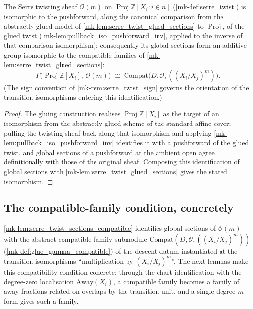 \begin{lemma}
  \label{mk-lem:serre_twist_sections_compatible}
  \leanok
  The Serre twisting sheaf \(\mathcal O(m)\) on
  \(\operatorname{Proj} \mathbb Z[X_i : i \in n]\) (\ref{mk-def:serre_twist})
  is isomorphic to the pushforward, along the canonical comparison from the
  abstractly glued model of \ref{mk-lem:serre_twist_glued_sections} to
  \(\operatorname{Proj}\), of the glued twist
  (\ref{mk-lem:pullback_iso_pushforward_inv}, applied to the inverse of that
  comparison isomorphism); consequently its global sections form an
  additive group isomorphic to the compatible families of
  \ref{mk-lem:serre_twist_glued_sections}:
  \[
    \Gamma\bigl(\operatorname{Proj}\mathbb Z[X_i],\, \mathcal O(m)\bigr)
      \;\cong\; \mathrm{Compat}\bigl(D, \mathcal O, ((X_i/X_j)^m)\bigr).
  \]
  (The sign convention of \ref{mk-rem:serre_twist_sign} governs the
  orientation of the transition isomorphisms entering this identification.)
\end{lemma}
\begin{proof}
  \leanok{}
  The gluing construction realises \(\operatorname{Proj}\mathbb Z[X_i]\) as
  the target of an isomorphism from the abstractly glued scheme of the
  standard affine cover; pulling the twisting sheaf back along that
  isomorphism and applying \ref{mk-lem:pullback_iso_pushforward_inv}
  identifies it with a pushforward of the glued twist, and global sections
  of a pushforward at the ambient open agree definitionally with those of
  the original sheaf. Composing this identification of global sections with
  \ref{mk-lem:serre_twist_glued_sections} gives the stated isomorphism.
\end{proof}

\subsection{The compatible-family condition, concretely}
\label{mk-subsec:serre_twist_compatible_condition}

\ref{mk-lem:serre_twist_sections_compatible} identifies global sections of
\(\mathcal O(m)\) with the abstract compatible-family submodule
\(\mathrm{Compat}(D, \mathcal O, ((X_i/X_j)^m))\)
(\ref{mk-def:glue_gamma_compatible}) of the descent datum instantiated at the
transition isomorphisms ``multiplication by \((X_i/X_j)^m\)''. The next
lemmas make this compatibility condition concrete: through the chart
identification with the degree-zero localisation \(\mathrm{Away}(X_i)\), a
compatible family becomes a family of away-fractions related on overlaps by
the transition unit, and a single degree-\(m\) form gives such a family.


